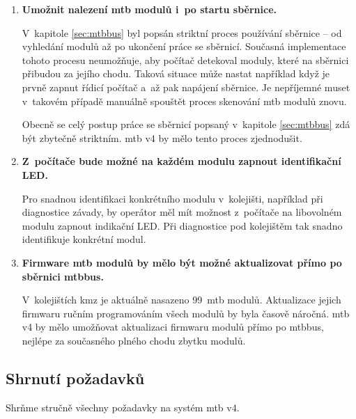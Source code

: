 \begin{enumerate}
\item \textbf{Umožnit nalezení \gls{mtb} modulů i~po startu sběrnice.}

	V~kapitole \ref{sec:mtbbus} byl popsán striktní proces používání
	sběrnice – od vyhledání modulů až po ukončení práce se sběrnicí. Současná
	implementace tohoto procesu neumožňuje, aby počítač detekoval moduly, které
	na sběrnici přibudou za jejího chodu. Taková situace může nastat například
	když je prvně zapnut řídicí počítač a~až pak napájení sběrnice. Je
	nepříjemné muset v~takovém případě manuálně spouštět proces skenování
	\gls{mtb} modulů znovu.

	Obecně se celý postup práce se sběrnicí popsaný v~kapitole \ref{sec:mtbbus}
	zdá být zbytečně striktním. \gls{mtb} v4 by mělo tento proces zjednodušit.

\item \textbf{Z~počítače bude možné na každém modulu zapnout identifikační LED.}

	Pro snadnou identifikaci konkrétního modulu v~kolejišti, například při
	diagnostice závady, by operátor měl mít možnost z~počítače na libovolném
	modulu zapnout indikační LED. Při diagnostice pod kolejištěm tak snadno
	identifikuje konkrétní modul.

\item \textbf{Firmware \gls{mtb} modulů by mělo být možné aktualizovat přímo
	po sběrnici \gls{mtbbus}.}

	V~kolejištích \gls{kmz} je aktuálně nasazeno 99~\gls{mtb} modulů.
	Aktualizace jejich firmwaru ručním programováním všech modulů by byla
	časově náročná. \gls{mtb} v4 by mělo umožňovat aktualizaci firmwaru modulů
	přímo po \gls{mtbbus}, nejlépe za současného plného chodu zbytku modulů.

\end{enumerate}

\subsection{Shrnutí požadavků} \label{sub:mtbbus-req-summary}

Shrňme stručně všechny požadavky na systém \gls{mtb} v4.

